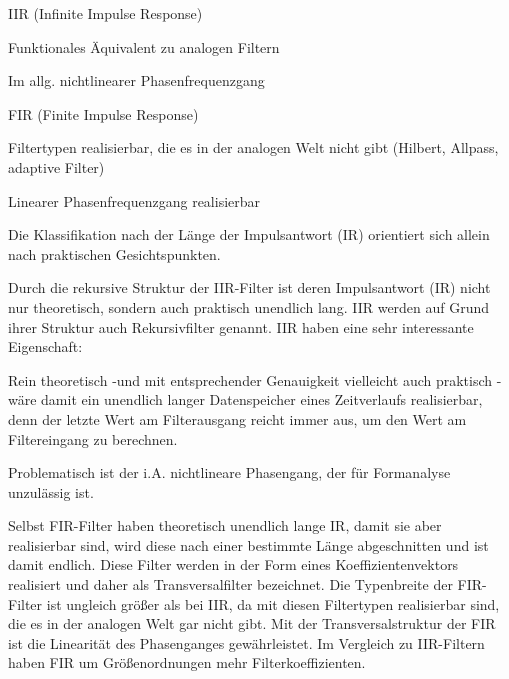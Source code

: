 \documentclass[a4paper]{article}
\begin{document}
\begin{multicols}{3}
  \begin{itemize*}
    \item IIR (Infinite Impulse Response)
    \begin{itemize*}
      \item Funktionales Äquivalent zu analogen Filtern
      \item Im allg. nichtlinearer Phasenfrequenzgang
    \end{itemize*}
    \item FIR (Finite Impulse Response)
    \begin{itemize*}
      \item Filtertypen realisierbar, die es in der analogen Welt nicht gibt (Hilbert, Allpass, adaptive Filter)
      \item Linearer Phasenfrequenzgang realisierbar
    \end{itemize*}
  \end{itemize*}

  Die Klassifikation nach der Länge der Impulsantwort (IR) orientiert sich
  allein nach praktischen Gesichtspunkten.

  \begin{itemize*}
    \item Durch die rekursive Struktur der IIR-Filter ist deren Impulsantwort (IR) nicht nur theoretisch, sondern auch praktisch unendlich lang. IIR werden auf Grund ihrer Struktur auch Rekursivfilter genannt. IIR haben eine sehr interessante Eigenschaft:
    \begin{itemize*}
      \item Rein theoretisch -und mit entsprechender Genauigkeit vielleicht auch praktisch -wäre damit ein unendlich langer Datenspeicher eines Zeitverlaufs realisierbar, denn der letzte Wert am Filterausgang reicht immer aus, um den Wert am Filtereingang zu berechnen.
      \item Problematisch ist der i.A. nichtlineare Phasengang, der für Formanalyse unzulässig ist.
    \end{itemize*}
    \item Selbst FIR-Filter haben theoretisch unendlich lange IR, damit sie aber realisierbar sind, wird diese nach einer bestimmte Länge abgeschnitten und ist damit endlich. Diese Filter werden in der Form eines Koeffizientenvektors realisiert und daher als Transversalfilter bezeichnet. Die Typenbreite der FIR-Filter ist ungleich größer als bei IIR, da mit diesen Filtertypen realisierbar sind, die es in der analogen Welt gar nicht gibt. Mit der Transversalstruktur der FIR ist die Linearität des Phasenganges gewährleistet. Im Vergleich zu IIR-Filtern haben FIR um Größenordnungen mehr Filterkoeffizienten.
  \end{itemize*}


\end{multicols}
\end{document}
